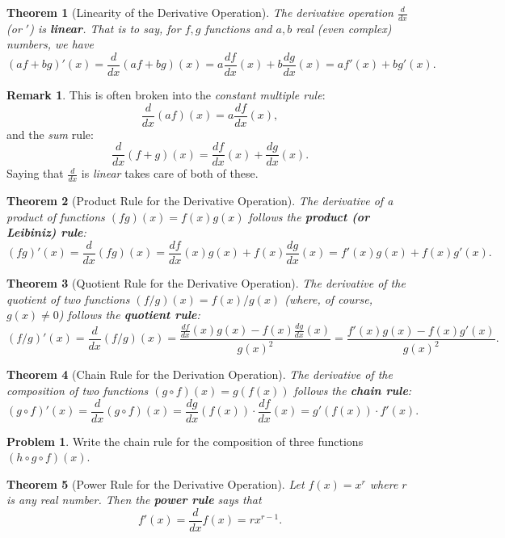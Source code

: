 \documentclass[12pt]{article}
\newtheorem{theorem}{Theorem}[section]
\theoremstyle{definition}
\newtheorem{remark}{Remark}[section]
\newtheorem{problem}{Problem}[section]
\begin{document}
\begin{theorem}[Linearity of the Derivative Operation]
The derivative operation $\frac{d}{dx}$ (or $'$) is \textbf{linear}. That is to say, for $f,g$ functions and $a,b$ real (even complex) numbers, we have
\[
(af+bg)'(x)=\frac{d}{dx}(af+bg)(x)=a\frac{df}{dx}(x)+b\frac{dg}{dx}(x)=af'(x)+bg'(x).
\]
\end{theorem}

\begin{remark}
This is often broken into the \emph{constant multiple rule}: 
\[
\frac{d}{dx}(af)(x)=a\frac{df}{dx}(x),
\]
and the \emph{sum} rule:
\[
\frac{d}{dx}(f+g)(x)=\frac{df}{dx}(x)+\frac{dg}{dx}(x).
\]
Saying that $\frac{d}{dx}$ is \emph{linear} takes care of both of these.
\end{remark}

\begin{theorem}[Product Rule for the Derivative Operation]
The derivative of a product of functions $(fg)(x)=f(x)g(x)$ follows the \textbf{product (or Leibiniz) rule}:
\[
(fg)'(x)=\frac{d}{dx}(fg)(x)=\frac{df}{dx}(x)g(x)+f(x)\frac{dg}{dx}(x)=f'(x)g(x)+f(x)g'(x).
\]
\end{theorem}

\begin{theorem}[Quotient Rule for the Derivative Operation]
The derivative of the quotient of two functions $(f/g)(x)=f(x)/g(x)$ (where, of course, $g(x)\neq 0$) follows the \textbf{quotient rule}:
\[
(f/g)'(x)=\frac{d}{dx}(f/g)(x)=\frac{\frac{df}{dx}(x)g(x)-f(x)\frac{dg}{dx}(x)}{g(x)^2}=\frac{f'(x)g(x)-f(x)g'(x)}{g(x)^2}.
\]
\end{theorem}

\begin{theorem}[Chain Rule for the Derivation Operation]
The derivative of the composition of two functions $(g\circ f)(x)=g(f(x))$ follows the \textbf{chain rule}:
\[
(g\circ f)'(x)=\frac{d}{dx}(g\circ f)(x)=\frac{dg}{dx}(f(x))\cdot\frac{df}{dx}(x)=g'(f(x))\cdot f'(x).
\]
\end{theorem}

\begin{problem}
Write the chain rule for the composition of three functions $(h\circ g \circ f)(x)$.
\end{problem}

\begin{theorem}[Power Rule for the Derivative Operation]
Let $f(x)=x^r$ where $r$ is any real number.  Then the \textbf{power rule} says that
\[
f'(x)=\frac{d}{dx}f(x)=rx^{r-1}.
\]
\end{theorem}
\end{document}
